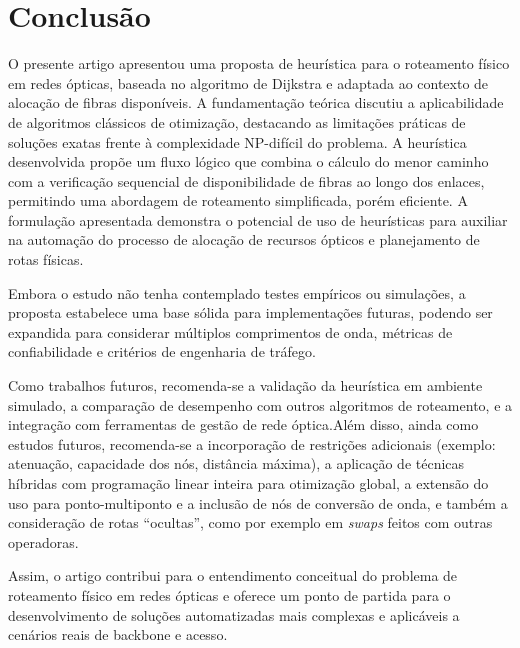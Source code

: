 \section{Conclusão} \label{sec:conclusion}

O presente artigo apresentou uma proposta de heurística para o roteamento
físico em redes ópticas, baseada no algoritmo de Dijkstra e adaptada ao
contexto de alocação de fibras disponíveis. A fundamentação teórica discutiu a
aplicabilidade de algoritmos clássicos de otimização, destacando as limitações
práticas de soluções exatas frente à complexidade NP-difícil do problema. A
heurística desenvolvida propõe um fluxo lógico que combina o cálculo do menor
caminho com a verificação sequencial de disponibilidade de fibras ao longo dos
enlaces, permitindo uma abordagem de roteamento simplificada, porém eficiente.
A formulação apresentada demonstra o potencial de uso de heurísticas para
auxiliar na automação do processo de alocação de recursos ópticos e
planejamento de rotas físicas.

Embora o estudo não tenha contemplado testes empíricos ou simulações, a
proposta estabelece uma base sólida para implementações futuras, podendo ser
expandida para considerar múltiplos comprimentos de onda, métricas de
confiabilidade e critérios de engenharia de tráfego.

Como trabalhos futuros, recomenda-se a validação da heurística em ambiente
simulado, a comparação de desempenho com outros algoritmos de roteamento, e a
integração com ferramentas de gestão de rede óptica.Além disso, ainda como
estudos futuros, recomenda-se a incorporação de restrições adicionais (exemplo:
atenuação, capacidade dos nós, distância máxima), a aplicação de técnicas
híbridas com programação linear inteira para otimização global, a extensão do
uso para ponto-multiponto e a inclusão de nós de conversão de onda, e também a
consideração de rotas “ocultas”, como por exemplo em \textit{swaps} feitos com
outras operadoras.

Assim, o artigo contribui para o entendimento
conceitual do problema de roteamento físico em redes ópticas e oferece um ponto
de partida para o desenvolvimento de soluções automatizadas mais complexas e
aplicáveis a cenários reais de backbone e acesso.


